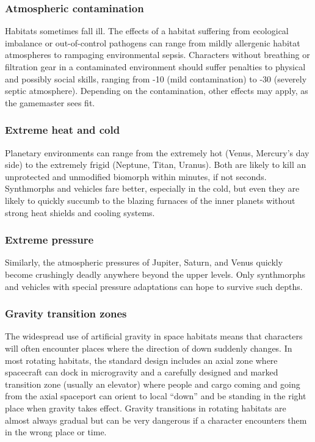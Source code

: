 \subsubsection{Atmospheric contamination} 

Habitats sometimes fall ill. The effects of a habitat suffering from ecological imbalance or out-of-control pathogens can range from mildly allergenic habitat atmospheres to rampaging environmental sepsis. Characters without breathing or filtration gear in a contaminated environment should suffer penalties to physical and possibly social skills, ranging from -10 (mild contamination) to -30 (severely septic atmosphere). Depending on the contamination, other effects may apply, as the gamemaster sees fit. 

\subsubsection{Extreme heat and cold} 

Planetary environments can range from the extremely hot (Venus, Mercury’s day side) to the extremely frigid (Neptune, Titan, Uranus). Both are likely to kill an unprotected and unmodified biomorph within minutes, if not seconds. Synthmorphs and vehicles fare better, especially in the cold, but even they are likely to quickly succumb to the blazing furnaces of the inner planets without strong heat shields and cooling systems. 

\subsubsection{Extreme pressure} 

Similarly, the atmospheric pressures of Jupiter, Saturn, and Venus quickly become crushingly deadly anywhere beyond the upper levels. Only synthmorphs and vehicles with special pressure adaptations can hope to survive such depths. 

\subsubsection{Gravity transition zones} 

The widespread use of artificial gravity in space habitats means that characters will often encounter places where the direction of down suddenly changes. In most rotating habitats, the standard design includes an axial zone where spacecraft can dock in microgravity and a carefully designed and marked transition zone (usually an elevator) where people and cargo coming and going from the axial spaceport can orient to local ``down'' and be standing in the right place when gravity takes effect. Gravity transitions in rotating habitats are almost always gradual but can be very dangerous if a character encounters them in the wrong place or time. 

